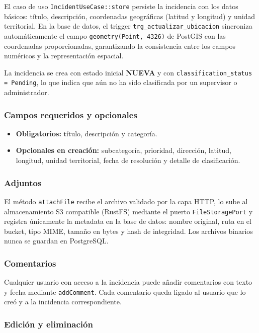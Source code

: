 \documentclass[12pt,a4paper]{article}
\begin{document}
El caso de uso \texttt{IncidentUseCase::store} persiste la incidencia con los
datos básicos: título, descripción, coordenadas geográficas (latitud y longitud)
y unidad territorial. En la base de datos, el trigger
\texttt{trg\_actualizar\_ubicacion} sincroniza automáticamente el campo
\texttt{geometry(Point, 4326)} de PostGIS con las coordenadas proporcionadas,
garantizando la consistencia entre los campos numéricos y la representación
espacial.

La incidencia se crea con estado inicial \textbf{NUEVA} y con
\texttt{classification\_status = Pending}, lo que indica que aún no ha sido
clasificada por un supervisor o administrador.

\subsubsection*{Campos requeridos y opcionales}

\begin{itemize}
    \item \textbf{Obligatorios:} título, descripción y categoría.
    \item \textbf{Opcionales en creación:} subcategoría, prioridad, dirección,
          latitud, longitud, unidad territorial, fecha de resolución y detalle
          de clasificación.
\end{itemize}

\subsubsection*{Adjuntos}

El método \texttt{attachFile} recibe el archivo validado por la capa HTTP,
lo sube al almacenamiento S3 compatible (RustFS) mediante el puerto
\texttt{FileStoragePort} y registra únicamente la metadata en la base de datos:
nombre original, ruta en el bucket, tipo MIME, tamaño en bytes y hash de
integridad. Los archivos binarios nunca se guardan en PostgreSQL.

\subsubsection*{Comentarios}

Cualquier usuario con acceso a la incidencia puede añadir comentarios con texto
y fecha mediante \texttt{addComment}. Cada comentario queda ligado al usuario
que lo creó y a la incidencia correspondiente.

\subsubsection*{Edición y eliminación}
\end{document}
